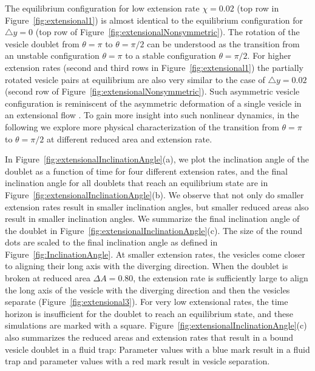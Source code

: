\documentclass[prf,superscriptaddress,showkeys,longbibliography]{revtex4-1}
\begin{document}
%
The equilibrium configuration for low extension rate $\chi=0.02$ (top row in Figure~\ref{fig:extensional1}) is
almost identical to the equilibrium configuration for $\triangle y=0$ (top row of  Figure~\ref{fig:extensionalNonsymmetric}).
The rotation of the vesicle doublet 
from $\theta=\pi$ to $\theta=\pi/2$ can be understood as the transition from an unstable configuration $\theta=\pi$ to a stable configuration $\theta=\pi/2$.
For higher extension rates (second and third rows in Figure~\ref{fig:extensional1}) the partially rotated vesicle pairs at equilibrium are
also very similar to the case of $\triangle y=0.02$ (second row of Figure~\ref{fig:extensionalNonsymmetric}).
Such asymmetric vesicle configuration is reminiscent of the asymmetric deformation of a single vesicle in an extensional flow \cite{KantslerSegreSteinberg2008_PRL,Narsimhan2014_JFM,DahlNarsimhanGouveia2016_SoftMatt}.
To gain more insight into such nonlinear dynamics, in the following we explore more physical characterization of the transition from $\theta=\pi$ to $\theta=\pi/2$ at
different reduced area and extension rate.
%

In Figure~\ref{fig:extensionalInclinationAngle}(a), we plot the
inclination angle of the doublet as a function of time for four
different extension rates,  and the final inclination angle for all
doublets that reach an equilibrium state are in
Figure~\ref{fig:extensionalInclinationAngle}(b).  We observe that not
only do smaller extension rates result in smaller inclination angles,
but smaller reduced areas also result in smaller inclination angles.  We
summarize the final inclination angle of the doublet in
Figure~\ref{fig:extensionalInclinationAngle}(c).  The size of the round
dots are scaled to the final inclination angle as defined in
Figure~\ref{fig:InclinationAngle}.  At smaller extension rates, the
vesicles come closer to aligning their long axis with the diverging
direction.  When the doublet is broken at reduced area $\Delta A =
0.80$, the extension rate is sufficiently large to align the long axis
of the vesicle with the diverging direction and then the vesicles
separate (Figure~\ref{fig:extensional3}).  For very low extensional
rates, the time horizon is insufficient for the doublet to reach an
equilibrium state, and these simulations are marked with a square.
Figure~\ref{fig:extensionalInclinationAngle}(c) also summarizes the
reduced areas and extension rates that result in a bound vesicle
doublet in a fluid trap: Parameter values with a blue mark result in a
fluid trap and parameter values with a red mark result in vesicle
separation.
\end{document}
